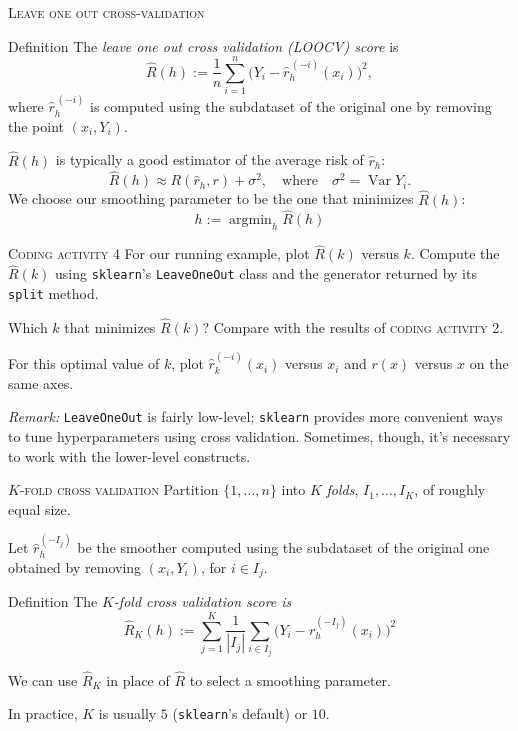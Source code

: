 \documentclass[xcolor={dvipsnames}]{beamer}
\renewcommand{\hat}{\widehat}
\DeclareMathOperator*{\argmin}{argmin}
\DeclareMathOperator{\Var}{Var}
\begin{document}
\begin{frame}{\textsc{Leave one out cross-validation}}
    \begin{block}{Definition}
        The \emph{leave one out cross validation (LOOCV) score} is
        \[
            \hat R(h) := \frac1n\sum_{i=1}^n\big(Y_i - \hat r_h^{\,(-i)}(x_i)\big)^2,
        \]
        where $\hat r_h^{\,(-i)}$ is computed using the subdataset of the original one by removing the point $(x_i, Y_i)$.
    \end{block}
    \vspace{-1ex}$\hat R(h)$ is typically a good estimator of the average risk of $\hat r_h$:
    \[
        \hat R(h) \approx R(\hat r_h, r) + \sigma^2,\quad\text{where}\quad\sigma^2 = \Var Y_i.
    \]
    We choose our smoothing parameter to be the one that minimizes $\hat R(h)$:
    \[
        h := \argmin_h \hat R(h)
    \]
\end{frame}

\begin{frame}{\textsc{Coding activity 4}}
    For our running example, plot $\hat R(k)$ versus $k$. Compute the $\hat R(k)$ using
    \texttt{sklearn}'s \texttt{LeaveOneOut} class and the generator returned by its
    \texttt{split} method.
    
    Which $k$ that minimizes $\hat R(k)$? Compare with the results of \textsc{coding activity 2}.

    For this optimal value of $k$, plot $\hat r_k^{(-i)}(x_i)$ versus $x_i$ and $r(x)$ versus $x$ on the same axes.

    \textit{Remark:} \texttt{LeaveOneOut} is fairly low-level; \texttt{sklearn} provides more 
    convenient ways to tune hyperparameters using cross validation.
    Sometimes, though, it's necessary to work with the lower-level constructs.
\end{frame}

\begin{frame}{\textsc{$K$-fold cross validation}}
Partition $\{1,\ldots,n\}$ into $K$ \emph{folds}, $I_1,\ldots,I_K$, of roughly equal size.

Let $\hat r_h^{(-I_j)}$ be the smoother computed using the subdataset of the original one
obtained by removing $(x_i, Y_i)$, for $i\in I_j$.

\begin{block}{Definition}
    The \emph{$K$-fold cross validation score is}
    \[
        \hat{R}_K(h) := \sum_{j=1}^K\frac1{|I_j|}\sum_{i\in I_j}\big(Y_i - r_h^{(-I_j)}(x_i)\big)^2
    \]
\end{block}

We can use $\hat{R}_K$ in place of $\hat{R}$ to select a smoothing parameter.

In practice, $K$ is usually $5$ (\texttt{sklearn}'s default) or $10$.
\end{frame}
\end{document}
